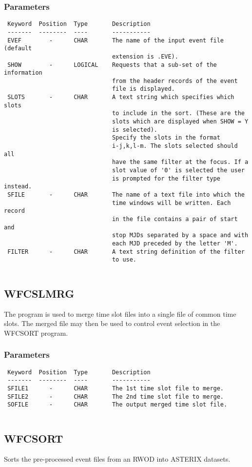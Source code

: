 \documentclass{book}
\renewcommand{\_}{{\tt\char'137}}     %
\begin{document}
\subsubsection{Parameters}
\begin{verbatim}
 Keyword  Position  Type       Description
 -------  --------  ----       -----------
 EVEF        -      CHAR       The name of the input event file (default
                               extension is .EVE).
 SHOW        -      LOGICAL    Requests that a sub-set of the information
                               from the header records of the event
                               file is displayed.
 SLOTS       -      CHAR       A text string which specifies which slots
                               to include in the sort. (These are the
                               slots which are displayed when SHOW = Y
                               is selected).
                               Specify the slots in the format
                               i-j,k,l-m. The slots selected should all
                               have the same filter at the focus. If a
                               slot value of '0' is selected the user
                               is prompted for the filter type instead.
 SFILE       -      CHAR       The name of a text file into which the
                               time windows will be written. Each record
                               in the file contains a pair of start and
                               stop MJDs separated by a space and with
                               each MJD preceded by the letter 'M'.
 FILTER      -      CHAR       A text string definition of the filter
                               to use.
 
\end{verbatim}\subsection{WFCSLMRG}
The program is used to merge time slot files into a single file of common
time slots. The merged file may then be used to control event selection
in the WFCSORT program.
 
\subsubsection{Parameters}
\begin{verbatim}
 Keyword  Position  Type       Description
 -------  --------  ----       -----------
 SFILE1      -      CHAR       The 1st time slot file to merge.
 SFILE2      -      CHAR       The 2nd time slot file to merge.
 SOFILE      -      CHAR       The output merged time slot file.
 
\end{verbatim}\subsection{WFCSORT}
Sorts the pre-processed event files from an RWOD into ASTERIX datasets.
 
\end{document}
